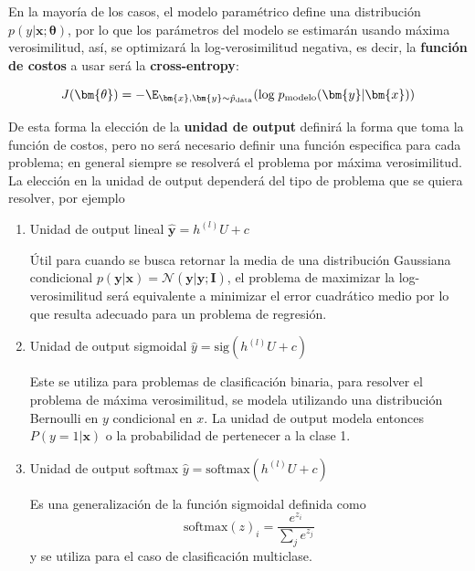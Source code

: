 En la mayor\'ia de los casos, el modelo param\'etrico define una distribuci\'on $p(y|\bm{x}; \bm{\theta})$, por lo que los par\'ametros del modelo se estimar\'an usando m\'axima verosimilitud, as\'i, se optimizar\'a la log-verosimilitud negativa, es decir, la \textbf{funci\'on de costos} a usar ser\'a la \textbf{cross-entropy}:

\begin{equation}
J(\bm{\theta}) = -\E_{\bm{x},\bm{y}\sim \hat{p}_{\textrm{data}}}(\textrm{log}\; p_{\textrm{modelo}}(\bm{y}|\bm{x}))
\end{equation}

De esta forma la elecci\'on de la \textbf{unidad de output} definir\'a la forma que toma la funci\'on de costos, pero no ser\'a necesario definir una funci\'on especifica para cada problema; en general siempre se resolver\'a el problema por m\'axima verosimilitud. La elecci\'on en la unidad de output depender\'a del tipo de problema que se quiera resolver, por ejemplo

\begin{enumerate}
  \item Unidad de output lineal $\hat{\bm{y}} = h^{(l)}U + c$ 

  Útil para cuando se busca retornar la media de una distribución Gaussiana condicional $p(\bm{y}|\bm{x}) = \mathcal{N}(\bm{y}|\hat{\bm{y}};\bm{I})$, el problema de maximizar la log-verosimilitud será equivalente a minimizar el error cuadrático medio por lo que resulta adecuado para un problema de regresión.

  \item Unidad de output sigmoidal $\hat{{y}} = \text{sig}(h^{(l)}U + c)$ 

  Este se utiliza para problemas de clasificación binaria, para resolver el problema de máxima verosimilitud, se modela utilizando una distribución Bernoulli en $y$ condicional en $x$. La unidad de output modela entonces $P(y=1|\bm{x})$ o la probabilidad de pertenecer a la clase 1.
   

  \item Unidad de output softmax $\hat{{y}} = \text{softmax}(h^{(l)}U + c)$  

  Es una generalización de la función sigmoidal definida como 
  \begin{equation*}
  \text{softmax}(z)_i = \frac{e^{z_i}}{\sum_{j}e^{z_j}}
  \end{equation*}
  y se utiliza para el caso de clasificación multiclase. 
\end{enumerate}


